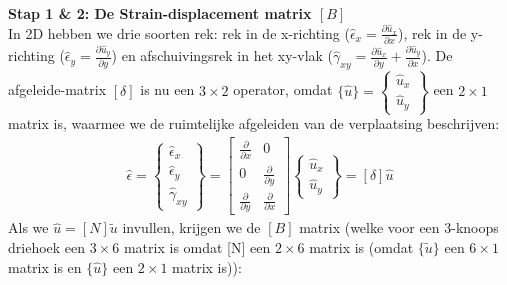 \documentclass[a4paper,11pt,twoside]{report}
\begin{document}
\textbf{Stap 1 \& 2: De Strain-displacement matrix $[B]$} \\
In 2D hebben we drie soorten rek: rek in de x-richting
($\hat{\epsilon}_x = \frac{\partial \hat{u}_x}{\partial x}$), rek in de y-richting
($\hat{\epsilon}_y = \frac{\partial \hat{u}_y}{\partial y}$) en afschuivingsrek in het xy-vlak
($\hat{\gamma}_{xy} = \frac{\partial \hat{u}_x}{\partial y} + \frac{\partial \hat{u}_y}{\partial x}$).
De afgeleide-matrix $[\delta]$ is nu een $3 \times 2$ operator, omdat
$\{\hat{u}\} = \begin{Bmatrix} \hat{u}_x \\ \hat{u}_y \end{Bmatrix}$ een $2 \times 1$ matrix is,
waarmee we de ruimtelijke afgeleiden van de verplaatsing beschrijven:
\begin{align*}
    \hat{\epsilon} = \begin{Bmatrix} \hat{\epsilon}_x \\ \hat{\epsilon}_y \\ \hat{\gamma}_{xy} \end{Bmatrix} = \begin{bmatrix} \frac{\partial}{\partial x} & 0 \\ 0 & \frac{\partial}{\partial y} \\ \frac{\partial}{\partial y} & \frac{\partial}{\partial x} \end{bmatrix} \begin{Bmatrix} \hat{u}_x \\ \hat{u}_y \end{Bmatrix} = [\delta]\hat{u}
\end{align*}
Als we $\hat{u} = [N]\tilde{u}$ invullen, krijgen we de $[B]$ matrix (welke voor een 3-knoops
driehoek een $3 \times 6$ matrix is omdat [N] een $2 \times 6$ matrix is (omdat $\{\tilde{u}\}$ een
$6 \times 1$ matrix is en $\{\hat{u}\}$ een $2 \times 1$ matrix is)):
\end{document}
